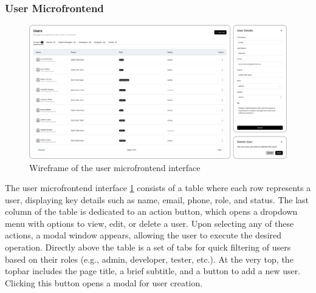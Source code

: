\subsubsection*{User Microfrontend}
\begin{figure}[h]
\centerline{\includegraphics[width=1\textwidth]{images/wireframes/user-microfrontend.png}}
\caption[User microfrontend wireframe]{Wireframe of the user microfrontend interface}
\label{fig:user-wireframe}
\end{figure}
The user microfrontend interface \ref{fig:user-wireframe} consists of a table where each row represents a user, displaying key details such as name, email, phone, role, and status. The last column of the table is dedicated to an action button, which opens a dropdown menu with options to view, edit, or delete a user. Upon selecting any of these actions, a modal window appears, allowing the user to execute the desired operation. Directly above the table is a set of tabs for quick filtering of users based on their roles (e.g., admin, developer, tester, etc.). At the very top, the topbar includes the page title, a brief subtitle, and a button to add a new user. Clicking this button opens a modal for user creation.

